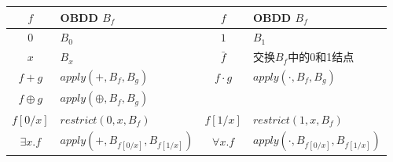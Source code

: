 \begin{center}
\begin{tabular}{c|l|c|l}
$f$ & OBDD $B_f$ & $f$ & OBDD $B_f$\\\hline
$0$ & $B_0$ & $1$ & $B_1$\\
$x$ & $B_x$ & $\bar{f}$ & 交换$B_f$中的0和1结点\\\hline
$f+g$ & $apply(+,B_f,B_g)$ & $f\cdot g$ & $apply(\cdot,B_f,B_g)$\\
$f\oplus g$ & $apply(\oplus,B_f,B_g)$ & &\\
$f[0/x]$ & $restrict(0,x,B_f)$ & $f[1/x]$ & $restrict(1,x,B_f)$\\\hline
$\exists x.f$ & $apply(+,B_{f[0/x]},B_{f[1/x]})$ & $\forall x.f$ & $apply(\cdot,B_{f[0/x]},B_{f[1/x]})$
\end{tabular}
\end{center}